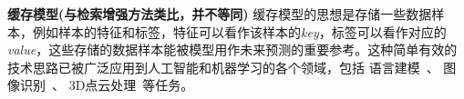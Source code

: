 \documentclass[12pt]{article}
\begin{document}


\textbf{缓存模型(与检索增强方法类比，并不等同)}
缓存模型的思想是存储一些数据样本，例如样本的特征和标签，特征可以看作该样本的\emph{key}，标签可以看作对应的\emph{value}，这些存储的数据样本能被模型用作未来预测的重要参考。这种简单有效的技术思路已被广泛应用到人工智能和机器学习的各个领域，包括
语言建模~\cite{grave17unbounded,merity17pointer,khandelwal20generalization}、
图像识别~\cite{vinyals16mn,snell17prototypical,chen18a,chen21meta-baseline,iwasawa21t3a,choi22improving,udandarao23sus-x,zhang22tip-adapter,zhang23cafo,karmanov24tda}、
3D点云处理~\cite{zhang23pointnn,tang24pointpeft,wang24bftt3d,sun25pointcache,tamjidi2025uniadapter}等任务。
\end{document}
